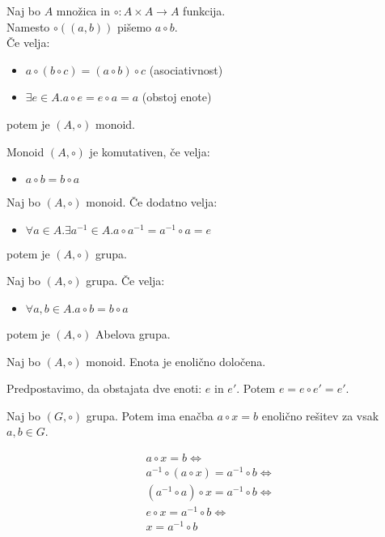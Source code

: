 \begin{definicija}
    Naj bo $A$ množica in $\circ: A \times A \to A$ funkcija. \\
    Namesto $\circ((a, b))$ pišemo $a \circ b$. \\
    Če velja:
    \begin{itemize}
        \item $a \circ (b \circ c) = (a \circ b) \circ c$ (asociativnost)
        \item $\exists e \in A. a \circ e = e \circ a = a$ (obstoj enote)
    \end{itemize}
    potem je $(A, \circ)$ monoid.
\end{definicija}

\begin{definicija}
    Monoid $(A, \circ)$ je komutativen, če velja:
    \begin{itemize}
        \item $a \circ b = b \circ a$
    \end{itemize}
\end{definicija}

\begin{definicija}
    Naj bo $(A, \circ)$ monoid.
    Če dodatno velja:
    \begin{itemize}
        \item $\forall a \in A. \exists a^{-1} \in A. a \circ a^{-1} = a^{-1} \circ a = e$
    \end{itemize}
    potem je $(A, \circ)$ grupa.
\end{definicija}

\begin{definicija}
    Naj bo $(A, \circ)$ grupa.
    Če velja:
    \begin{itemize}
        \item $\forall a, b \in A. a \circ b = b \circ a$
    \end{itemize}
    potem je $(A, \circ)$ Abelova grupa.
\end{definicija}

\begin{trditev}
    Naj bo $(A, \circ)$ monoid.
    Enota je enolično določena.
\end{trditev}
\begin{dokaz}
    Predpostavimo, da obstajata dve enoti: $e$ in $e'$.
    Potem $e = e \circ e' = e'$.
\end{dokaz}

\begin{trditev}
    Naj bo $(G, \circ)$ grupa.
    Potem ima enačba $a \circ x = b$ enolično rešitev za vsak $a, b \in G$.
\end{trditev}
\begin{dokaz}
    \begin{align*}
        a \circ x = b \iff \\
        a^{-1} \circ (a \circ x) = a^{-1} \circ b \iff \\
        (a^{-1} \circ a) \circ x = a^{-1} \circ b \iff \\
        e \circ x = a^{-1} \circ b \iff \\
        x = a^{-1} \circ b
    \end{align*}
\end{dokaz}

